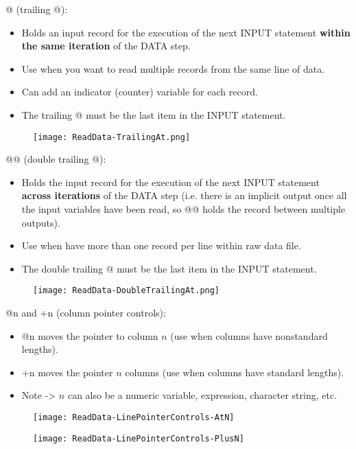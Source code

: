 \documentclass[11pt, oneside]{article}
\begin{document}
@ (trailing @):
\begin{itemize}
\item Holds an input record for the execution of the next INPUT statement \textbf{within the same iteration} of the DATA step.
\item Use when you want to read multiple records from the same line of data.
\item Can add an indicator (counter) variable for each record.
\item The trailing @ must be the last item in the INPUT statement.
\end{itemize}

\begin{figure}[H]
\texttt{[image: ReadData-TrailingAt.png]}
\end{figure}

@@ (double trailing @):
\begin{itemize}
\item Holds the input record for the execution of the next INPUT statement \textbf{across iterations} of the DATA step (i.e. there is an implicit output once all the input variables have been read, so @@ holds the record between multiple outputs).
\item Use when have more than one record per line within raw data file.
\item The double trailing @ must be the last item in the INPUT statement.
\end{itemize}

\begin{figure}[H]
\texttt{[image: ReadData-DoubleTrailingAt.png]}
\end{figure}

@n and +n (column pointer controls):
\begin{itemize}
\item @n moves the pointer to column $n$ (use when columns have nonstandard lengths).
\item +n moves the pointer $n$ columns (use when columns have standard lengths).
\item Note -> $n$ can also be a numeric variable, expression, character string, etc.
\end{itemize}


\begin{figure}[H]
	\begin{minipage}{0.3\textwidth}
		\centering\texttt{[image: ReadData-LinePointerControls-AtN]}
	\end{minipage}
	\begin{minipage}{0.3\textwidth}
		\centering\texttt{[image: ReadData-LinePointerControls-PlusN]}
	\end{minipage}
\end{figure}
\end{document}
